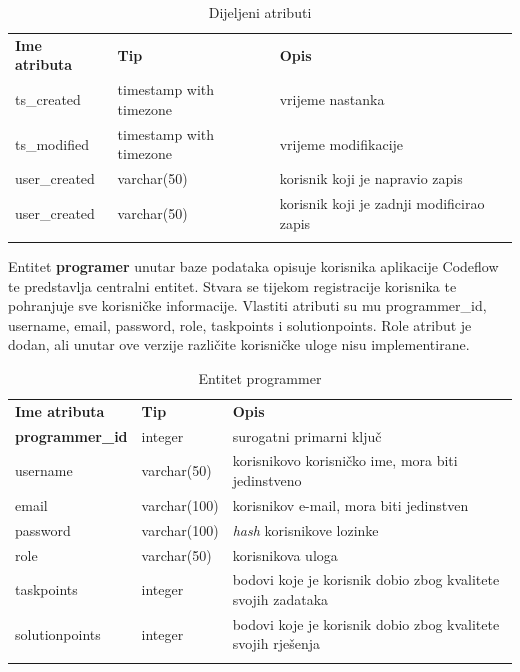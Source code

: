 \documentclass[times, utf8, zavrsni]{fer}
\begin{document}
		\begin{table}[H]
			\caption{Dijeljeni atributi}
			\label{tbl:dij-attr}
			\centering
			\begin{tabu} to \textwidth {XXX}
				\tabucline[1.75pt]{-}
				\textbf{Ime atributa} & \textbf{Tip} & \textbf{Opis}\\				
				\tabucline[1.75pt]{-}
				ts\_created & timestamp with timezone & vrijeme nastanka\\ \hline
				ts\_modified & timestamp with timezone & vrijeme modifikacije\\ \hline
				user\_created & varchar(50) & korisnik koji je napravio zapis\\ \hline
				user\_created & varchar(50) & korisnik koji je zadnji modificirao zapis\\
				\tabucline[1.75pt]{-}
			\end{tabu}
		\end{table}
		
		Entitet \textbf{programer} unutar baze podataka opisuje korisnika aplikacije Codeflow te predstavlja centralni entitet. Stvara se tijekom registracije korisnika te pohranjuje sve korisničke informacije. Vlastiti atributi su mu programmer\_id, username, email, password, role, taskpoints i solutionpoints. Role atribut je dodan, ali unutar ove verzije različite korisničke uloge nisu implementirane.
		\begin{table}[H]
			\caption{Entitet programmer}
			\label{tbl:programmer}
			\centering
			\begin{tabu} to \textwidth {XXX}
				\tabucline[1.75pt]{-}
				\textbf{Ime atributa} & \textbf{Tip} & \textbf{Opis}\\ 				
				\tabucline[1.75pt]{-}
				\textbf{programmer\_id} & integer & surogatni primarni ključ\\ \hline
				username & varchar(50) & korisnikovo korisničko ime, mora biti jedinstveno\\ \hline
				email & varchar(100) & korisnikov e-mail, mora biti jedinstven\\ \hline
				password & varchar(100) & \textit{hash} korisnikove lozinke\\ \hline
				role & varchar(50) & korisnikova uloga\\ \hline
				taskpoints & integer & bodovi koje je korisnik dobio zbog kvalitete svojih zadataka\\ \hline
				solutionpoints & integer &  bodovi koje je korisnik dobio zbog kvalitete svojih rješenja\\
				\tabucline[1.75pt]{-}
			\end{tabu}
		\end{table}
		
\end{document}
